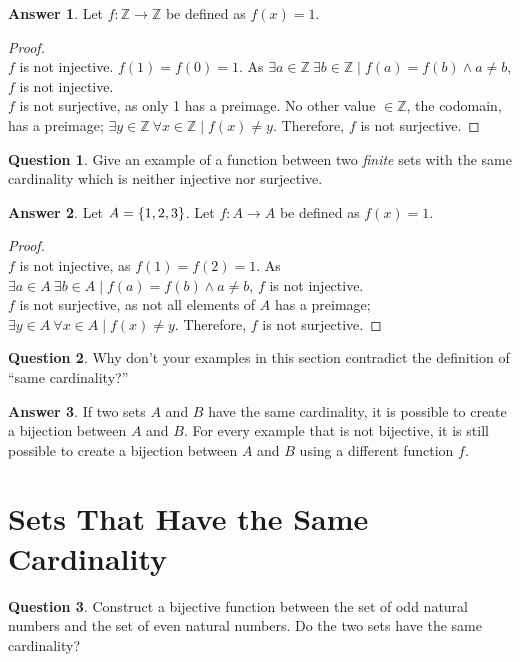 \documentclass[article, 12pt]{article}
\theoremstyle{definition}
\newtheorem{question}{Question}
\newtheorem{answer}{Answer}
\DeclarePairedDelimiter\set{\{}{\}}
\newcommand{\ints}{\mathbb{Z}}
\begin{document}
    \begin{answer}
        Let $f: \ints \to \ints$ be defined as $f(x) = 1$. 
        \begin{proof} \ \\
            $f$ is not injective. $f(1) = f(0) = 1$. As $\exists a \in \ints \ \exists b \in \ints \mid f(a) = f(b) \land a \neq b$, $f$ is not injective. 
            \\[12pt]
            $f$ is not surjective, as only 1 has a preimage. No other value $\in \ints$, the codomain, has a preimage; $\exists y \in \ints \  \forall x \in \ints \mid f(x) \neq y$. Therefore, $f$ is not surjective.  
        \end{proof}
    \end{answer}

    \begin{question}
        Give an example of a function between two \textit{finite} sets with the same cardinality which is neither injective nor surjective.    
    \end{question}

    \begin{answer}
        Let $A = \set*{1,2,3}$. Let $f: A \to A$ be defined as $f(x) = 1$. 
        \begin{proof} \ \\
            $f$ is not injective, as $f(1) = f(2) = 1$. As $\exists a \in A \ \exists b \in A \mid f(a) = f(b) \land a \neq b$, $f$ is not injective. 
            \\[12pt]
            $f$ is not surjective, as not all elements of $A$ has a preimage; $\exists y \in A \ \forall x \in A \mid f(x) \neq y$. Therefore, $f$ is not surjective.
        \end{proof}
    \end{answer}

    \begin{question}
        Why don't your examples in this section contradict the definition of ``same cardinality?''  
    \end{question}

    \begin{answer}
        If two sets $A$ and $B$ have the same cardinality, it is possible to create a bijection between $A$ and $B$. For every example that is not bijective, it is still possible to create a bijection between $A$ and $B$ using a different function $f$.
    \end{answer}

    \section{Sets That Have the Same Cardinality}
    \begin{question}
        Construct a bijective function between the set of odd natural numbers and the set of even natural numbers. Do the two sets have the same cardinality?
    \end{question}
\end{document}
